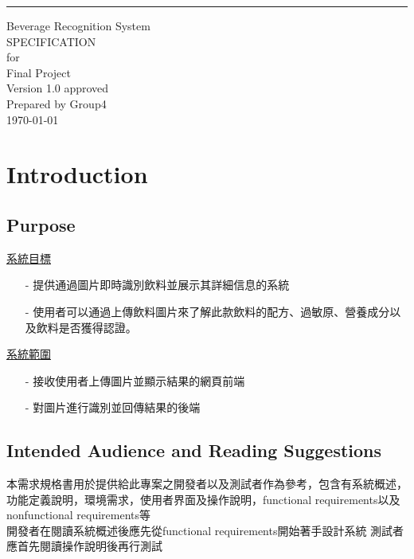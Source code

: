 \documentclass{scrreprt}
\date{}
\def\myversion{1.0 }
\begin{document}
\begin{CJK}{UTF8}{bkai}
\begin{flushright}
    \rule{16cm}{5pt}\vskip1cm
    \begin{bfseries}
        \Huge{Beverage Recognition System\\ SPECIFICATION}\\
        \vspace{1.9cm}
        for\\
        \vspace{1.9cm}
        Final Project\\
        \vspace{1.9cm}
        \LARGE{Version \myversion approved}\\
        \vspace{1.9cm}
        Prepared by Group4\\
        \vspace{1.9cm}
        \today\\
    \end{bfseries}
\end{flushright}

\tableofcontents

\chapter{Introduction}

\section{Purpose}
\underline{系統目標}
\begin{itemize}
\item[-] 提供通過圖片即時識別飲料並展示其詳細信息的系統
\item[-] 使用者可以通過上傳飲料圖片來了解此款飲料的配方、過敏原、營養成分以及飲料是否獲得認證。
\end{itemize}

\noindent \underline{系統範圍}

\begin{itemize}
\item[-] 接收使用者上傳圖片並顯示結果的網頁前端
\item[-] 對圖片進行識別並回傳結果的後端
\end{itemize}


\section{Intended Audience and Reading Suggestions}
本需求規格書用於提供給此專案之開發者以及測試者作為參考，包含有系統概述，功能定義說明，環境需求，使用者界面及操作說明，functional requirements以及nonfunctional requirements等\\
開發者在閱讀系統概述後應先從functional requirements開始著手設計系統
測試者應首先閱讀操作說明後再行測試


\end{CJK}
\end{document}
